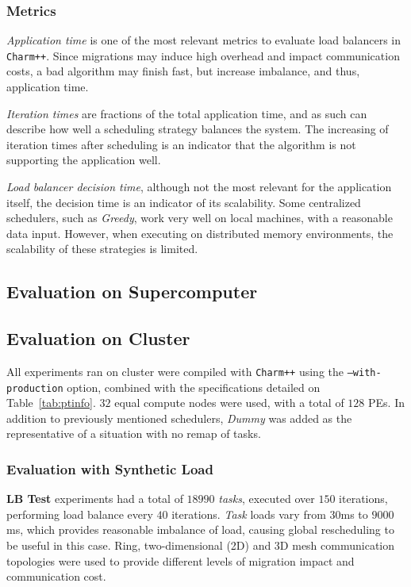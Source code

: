 \subsubsection*{Metrics}

\textit{Application time} is one of the most relevant metrics to evaluate load balancers in \texttt{Charm++}.
Since migrations may induce high overhead and impact communication costs, a bad algorithm may finish fast, but increase imbalance, and thus, application time.

\textit{Iteration times} are fractions of the total application time, and as such can describe how well a scheduling strategy balances the system.
The increasing of iteration times after scheduling is an indicator that the algorithm is not supporting the application well.

\textit{Load balancer decision time}, although not the most relevant for the application itself, the decision time is an indicator of its scalability.
Some centralized schedulers, such as \textit{Greedy}, work very well on local machines, with a reasonable data input.
However, when executing on distributed memory environments, the scalability of these strategies is limited.

\subsection{Evaluation on Supercomputer}

\subsection{Evaluation on Cluster}

All experiments ran on cluster were compiled with \texttt{Charm++} using the \texttt{--with-production} option, combined with the specifications detailed on Table~\ref{tab:ptinfo}.
$32$ equal compute nodes were used, with a total of $128$ PEs.
In addition to previously mentioned schedulers, \textit{Dummy} was added as the representative of a situation with no remap of tasks.

\subsubsection*{Evaluation with Synthetic Load}

\textbf{LB Test} experiments had a total of $18990$ \textit{tasks}, executed over $150$ iterations, performing load balance every $40$ iterations.
\textit{Task} loads vary from $30$ms to $9000$ms, which provides reasonable imbalance of load, causing global rescheduling to be useful in this case.
Ring, two-dimensional (2D) and 3D mesh communication topologies were used to provide different levels of migration impact and communication cost.

